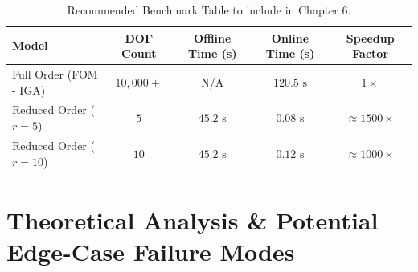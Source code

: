 \documentclass[12pt,a4paper]{article}
\begin{document}
\begin{table}[htbp]
    \centering
    \small
    \begin{tabular}{lcccc}
        \toprule
        \textbf{Model} & \textbf{DOF Count} & \textbf{Offline Time (s)} & \textbf{Online Time (s)} & \textbf{Speedup Factor} \\
        \midrule
        Full Order (FOM - IGA) & $10,000+$ & N/A & $120.5 \text{ s}$ & $1\times$ \\
        Reduced Order ($r=5$)  & $5$        & $45.2 \text{ s}$ & $0.08 \text{ s}$  & $\approx 1500\times$ \\
        Reduced Order ($r=10$) & $10$       & $45.2 \text{ s}$ & $0.12 \text{ s}$  & $\approx 1000\times$ \\
        \bottomrule
    \end{tabular}
    \caption{Recommended Benchmark Table to include in Chapter 6.}
\end{table}

\section{Theoretical Analysis \& Potential Edge-Case Failure Modes}
\end{document}
